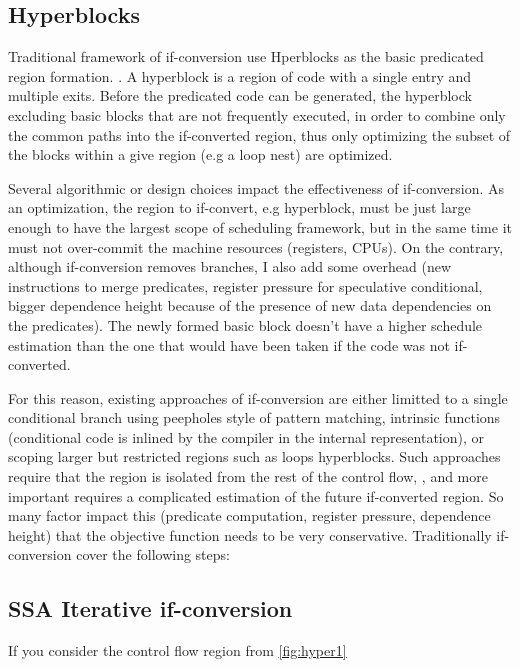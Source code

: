 \subsection{Hyperblocks}

Traditional framework of if-conversion use Hperblocks as the basic predicated region formation. \cite{Mahlke:1992:ECS:144965.144998}. A hyperblock is a region of code with a single entry and multiple exits. Before the predicated code can be generated, the hyperblock excluding basic blocks that are not frequently executed, in order to combine only the common paths into the if-converted region, thus only optimizing the subset of the blocks within a give region (e.g a loop nest) are optimized. 

Several algorithmic or design choices impact the effectiveness of if-conversion. As an optimization, the region to if-convert, e.g hyperblock, must be just large enough to have the largest scope of scheduling framework, but in the same time it must not over-commit the machine resources (registers, CPUs). On the contrary, although if-conversion removes branches, I also add some overhead (new instructions to merge predicates, register pressure for speculative conditional, bigger dependence height because of the presence of new data dependencies on the predicates). The newly formed basic block doesn't have a higher schedule estimation than the one that would have been taken if the code was not if-converted.

For this reason, existing approaches of if-conversion are either limitted to a single conditional branch using peepholes style of pattern matching, intrinsic functions (conditional code is inlined by the compiler in the internal representation), or scoping larger but restricted regions such as loops hyperblocks. Such approaches require that the region is isolated from the rest of the control flow, , and more important requires a complicated estimation of the future if-converted region. So many factor impact this (predicate computation, register pressure, dependence height) that the objective function needs to be very conservative. Traditionally if-conversion cover the following steps:

\subsection{SSA Iterative if-conversion}

If you consider the control flow region from \ref{fig:hyper1} 

